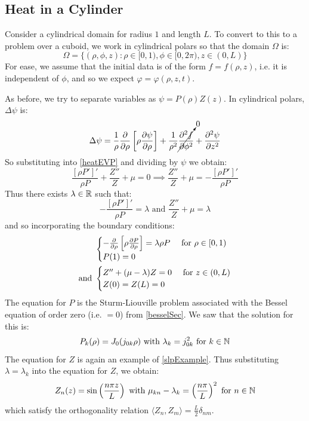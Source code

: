 \documentclass[../main.tex]{subfiles}
\begin{document}
\subsection{Heat in a Cylinder}
Consider a cylindrical domain for radius $1$ and length $L$.
To convert to this to a problem over a cuboid, we work in cylindrical polars so that the domain $\Omega$ is:
\[
  \Omega = \{(\rho, \phi, z): \rho \in [0, 1), \phi \in [0, 2\pi), z \in (0, L)\}
\]
For ease, we assume that the initial data is of the form $f = f(\rho, z)$, i.e. it is independent of $\phi$, and so we expect $\varphi = \varphi(\rho, z, t)$.

As before, we try to separate variables as $\psi = P(\rho)Z(z)$.
In cylindrical polars, $\Delta \psi$ is:
\[
  \Delta \psi = \frac{1}{\rho} \pderiv{}{\rho}\left[\rho \pderiv{\psi}{\rho}\right] + \frac{1}{\rho^2} \cancelto{0}{\pderiv[2]{f}{\phi}} + \pderiv[2]{\psi}{z}
\]
So substituting into \cref{heatEVP} and dividing by $\psi$ we obtain:
\[
  \frac{[\rho P']'}{\rho P} + \frac{Z''}{Z} + \mu = 0 \implies \frac{Z''}{Z} + \mu = - \frac{[\rho P']'}{\rho P}
\]
Thus there exists $\lambda \in \mathbb{R}$ such that:
\[
  -\frac{[\rho P']'}{\rho P} = \lambda \text{ and } \frac{Z''}{Z} + \mu = \lambda
\]
and so incorporating the boundary conditions:
\begin{align*}
  &\begin{cases}
  -\pderiv{}{\rho}\left[\rho \pderiv{P}{\rho}\right] = \lambda \rho P & \text{ for } \rho \in [0, 1) \\
  P(1) = 0 &
  \end{cases} \\
  \text{and } &\begin{cases}
  Z'' + (\mu - \lambda)Z = 0 & \text{ for } z \in (0, L) \\
  Z(0) = Z(L) = 0 &
  \end{cases}
\end{align*}
The equation for $P$ is the Sturm-Liouville problem associated with the Bessel equation of order zero (i.e. $ = 0$) from \cref{besselSec}.
We saw that the solution for this is:
\[
  P_k(\rho) = J_0(j_{0 k} \rho) \text{ with } \lambda_k = j^2_{0 k} \text{ for } k \in \mathbb{N}
\]
The equation for $Z$ is again an example of \cref{slpExample}.
Thus substituting $\lambda = \lambda_k$ into the equation for $Z$, we obtain:
\[
  Z_n(z) = \sin\left(\frac{n \pi z}{L}\right) \text{ with } \mu_{k n} - \lambda_k = \left(\frac{n \pi}{L}\right)^2 \text{ for } n \in \mathbb{N}
\]
which satisfy the orthogonality relation $\langle Z_n, Z_m \rangle = \frac{L}{2} \delta_{n m}$.
\end{document}
